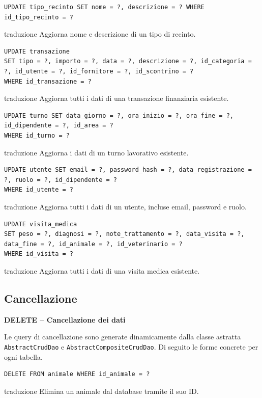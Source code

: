 \documentclass[12pt,a4paper]{report}
\begin{document}
\begin{lstlisting}[style=sqlstyle]
UPDATE tipo_recinto SET nome = ?, descrizione = ? WHERE id_tipo_recinto = ?
\end{lstlisting}
traduzione {Aggiorna nome e descrizione di un tipo di recinto.}

\begin{lstlisting}[style=sqlstyle]
UPDATE transazione
SET tipo = ?, importo = ?, data = ?, descrizione = ?, id_categoria = ?, id_utente = ?, id_fornitore = ?, id_scontrino = ?
WHERE id_transazione = ?
\end{lstlisting}
traduzione {Aggiorna tutti i dati di una transazione finanziaria esistente.}

\begin{lstlisting}[style=sqlstyle]
UPDATE turno SET data_giorno = ?, ora_inizio = ?, ora_fine = ?, id_dipendente = ?, id_area = ?
WHERE id_turno = ?
\end{lstlisting}
traduzione {Aggiorna i dati di un turno lavorativo esistente.}

\begin{lstlisting}[style=sqlstyle]
UPDATE utente SET email = ?, password_hash = ?, data_registrazione = ?, ruolo = ?, id_dipendente = ?
WHERE id_utente = ?
\end{lstlisting}
traduzione {Aggiorna tutti i dati di un utente, incluse email, password e ruolo.}

\begin{lstlisting}[style=sqlstyle]
UPDATE visita_medica
SET peso = ?, diagnosi = ?, note_trattamento = ?, data_visita = ?, data_fine = ?, id_animale = ?, id_veterinario = ?
WHERE id_visita = ?
\end{lstlisting}
traduzione {Aggiorna tutti i dati di una visita medica esistente.}

\subsection{Cancellazione}

\newpage
\textbf{DELETE -- Cancellazione dei dati}

Le query di cancellazione sono generate dinamicamente dalla classe astratta \texttt{AbstractCrudDao} e \texttt{AbstractCompositeCrudDao}. Di seguito le forme concrete per ogni tabella.

\begin{lstlisting}[style=sqlstyle]
DELETE FROM animale WHERE id_animale = ?
\end{lstlisting}
traduzione {Elimina un animale dal database tramite il suo ID.}
\end{document}

